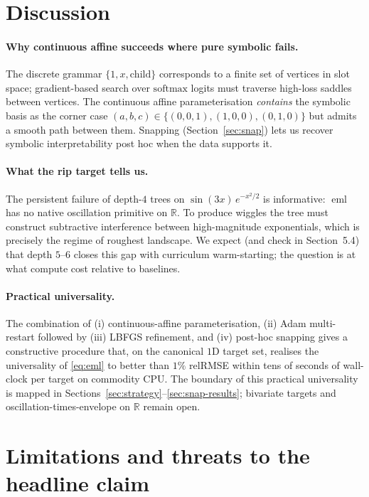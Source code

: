 \documentclass[11pt]{article}
\newcommand{\eml}{\operatorname{eml}}
\begin{document}
\section{Discussion}

\paragraph{Why continuous affine succeeds where pure symbolic fails.}
The discrete grammar $\{1, x, \text{child}\}$ corresponds to a finite set of
vertices in slot space; gradient-based search over $\mathrm{softmax}$ logits
must traverse high-loss saddles between vertices. The continuous affine
parameterisation \emph{contains} the symbolic basis as the corner case
$(a,b,c) \in \{(0,0,1), (1,0,0), (0,1,0)\}$ but admits a smooth path between
them. Snapping (Section~\ref{sec:snap}) lets us recover symbolic interpretability
post hoc when the data supports it.

\paragraph{What the rip target tells us.}
The persistent failure of depth-$4$ trees on $\sin(3x)\,e^{-x^2/2}$ is
informative: $\eml$ has no native oscillation primitive on $\mathbb{R}$. To
produce wiggles the tree must construct subtractive interference between
high-magnitude exponentials, which is precisely the regime of roughest
landscape. We expect (and check in Section~5.4) that depth $5$--$6$ closes
this gap with curriculum warm-starting; the question is at what compute
cost relative to baselines.

\paragraph{Practical universality.}
The combination of (i) continuous-affine parameterisation, (ii) Adam
multi-restart followed by (iii) LBFGS refinement, and (iv) post-hoc snapping
gives a constructive procedure that, on the canonical $1$D target set,
realises the universality of \eqref{eq:eml} to better than $1\%$ relRMSE
within tens of seconds of wall-clock per target on commodity CPU. The
boundary of this practical universality is mapped in
Sections~\ref{sec:strategy}--\ref{sec:snap-results}; bivariate targets and
oscillation-times-envelope on $\mathbb{R}$ remain open.

\section{Limitations and threats to the headline claim}
\label{sec:limits}
\end{document}
